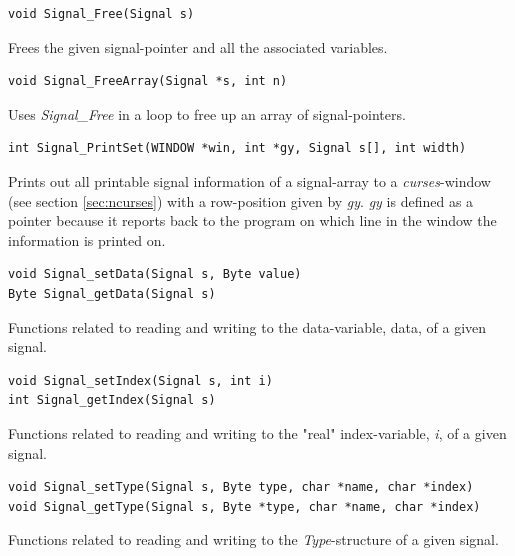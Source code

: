 \documentclass[main.tex]{subfiles}
\begin{document}
\begin{lstlisting}[frame=single] 
void Signal_Free(Signal s)
\end{lstlisting}

Frees the given signal-pointer and all the associated variables.\\

\begin{lstlisting}[frame=single] 
void Signal_FreeArray(Signal *s, int n)
\end{lstlisting}

Uses \textit{Signal\_Free} in a loop to free up an array of signal-pointers.\\

\begin{lstlisting}[frame=single] 
int Signal_PrintSet(WINDOW *win, int *gy, Signal s[], int width)
\end{lstlisting}

Prints out all printable signal information of a signal-array to a \textit{curses}-window (see section \ref{sec:ncurses}) with a row-position given by \textit{gy}. \textit{gy} is defined as a pointer because it reports back to the program on which line in the window the information is printed on. \\

\begin{lstlisting}[frame=single] 
void Signal_setData(Signal s, Byte value)
Byte Signal_getData(Signal s)
\end{lstlisting}

Functions related to reading and writing to the data-variable, data, of a given signal.\\

\begin{lstlisting}[frame=single] 
void Signal_setIndex(Signal s, int i)
int Signal_getIndex(Signal s)
\end{lstlisting}

Functions related to reading and writing to the "real" index-variable, \textit{i}, of a given signal.\\

\begin{lstlisting}[frame=single] 
void Signal_setType(Signal s, Byte type, char *name, char *index)
void Signal_getType(Signal s, Byte *type, char *name, char *index)
\end{lstlisting}

Functions related to reading and writing to the \textit{Type}-structure of a given signal.\\
\end{document}
